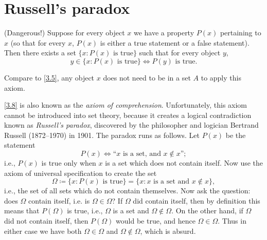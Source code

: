 \section{Russell's paradox}\label{sec 3.2}

\begin{axiom}\label{3.8}
  (Dangerous!)
  Suppose for every object \(x\) we have a property \(P(x)\) pertaining to \(x\) (so that for every \(x\), \(P(x)\) is either a true statement or a false statement).
  Then there exists a set \(\{x : P(x) \text{ is true}\}\) such that for every object \(y\),
  \[
    y \in \{x : P(x) \text{ is true}\} \iff P(y) \text{ is true}.
  \]
\end{axiom}

\begin{note}
  Compare to \cref{3.5}, any object \(x\) does not need to be in a set \(A\) to apply this axiom.
\end{note}

\begin{note}
  \cref{3.8} is also known as the \emph{axiom of comprehension}.
  Unfortunately, this axiom cannot be introduced into set theory, because it creates a logical contradiction known as \emph{Russell's paradox}, discovered by the philosopher and logician Bertrand Russell (1872--1970) in 1901.
  The paradox runs as follows.
  Let \(P(x)\) be the statement
  \[
    P(x) \iff \text{``\(x\) is a set, and \(x \notin x\)''};
  \]
  i.e., \(P(x)\) is true only when \(x\) is a set which does not contain itself.
  Now use the axiom of universal specification to create the set
  \[
    \Omega \coloneqq \{x : P(x) \text{ is true}\} = \{x : x \text{ is a set and } x \notin x\},
  \]
  i.e., the set of all sets which do not contain themselves.
  Now ask the question: does \(\Omega\) contain itself, i.e. is \(\Omega \in \Omega\)?
  If \(\Omega\) did contain itself, then by definition this means that \(P(\Omega)\) is true, i.e., \(\Omega\) is a set and \(\Omega \notin \Omega\).
  On the other hand, if \(\Omega\) did not contain itself, then \(P(\Omega)\) would be true, and hence \(\Omega \in \Omega\).
  Thus in either case we have both \(\Omega \in \Omega\) and \(\Omega \notin \Omega\), which is absurd.
\end{note}

